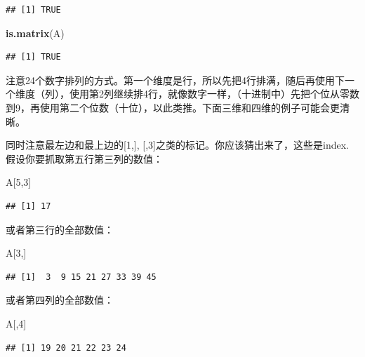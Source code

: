 \documentclass[]{book}
\newenvironment{Shaded}{\begin{snugshade}}{\end{snugshade}}
\newcommand{\DecValTok}[1]{\textcolor[rgb]{0.00,0.00,0.81}{#1}}
\newcommand{\KeywordTok}[1]{\textcolor[rgb]{0.13,0.29,0.53}{\textbf{#1}}}
\newcommand{\NormalTok}[1]{#1}
\begin{document}
\begin{verbatim}
## [1] TRUE
\end{verbatim}

\begin{Shaded}
\begin{Highlighting}[]
\KeywordTok{is.matrix}\NormalTok{(A)}
\end{Highlighting}
\end{Shaded}

\begin{verbatim}
## [1] TRUE
\end{verbatim}

注意24个数字排列的方式。第一个维度是行，所以先把4行排满，随后再使用下一个维度（列），使用第2列继续排4行，就像数字一样，（十进制中）先把个位从零数到9，再使用第二个位数（十位），以此类推。下面三维和四维的例子可能会更清晰。

同时注意最左边和最上边的{[}1,{]}, {[},3{]}之类的标记。你应该猜出来了，这些是index. 假设你要抓取第五行第三列的数值：

\begin{Shaded}
\begin{Highlighting}[]
\NormalTok{A[}\DecValTok{5}\NormalTok{,}\DecValTok{3}\NormalTok{]}
\end{Highlighting}
\end{Shaded}

\begin{verbatim}
## [1] 17
\end{verbatim}

或者第三行的全部数值：

\begin{Shaded}
\begin{Highlighting}[]
\NormalTok{A[}\DecValTok{3}\NormalTok{,]}
\end{Highlighting}
\end{Shaded}

\begin{verbatim}
## [1]  3  9 15 21 27 33 39 45
\end{verbatim}

或者第四列的全部数值：

\begin{Shaded}
\begin{Highlighting}[]
\NormalTok{A[,}\DecValTok{4}\NormalTok{]}
\end{Highlighting}
\end{Shaded}

\begin{verbatim}
## [1] 19 20 21 22 23 24
\end{verbatim}
\end{document}
